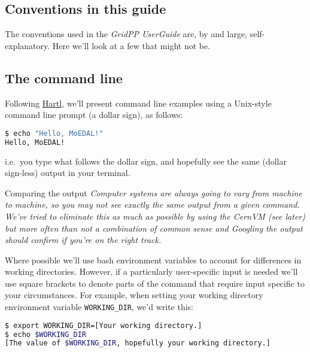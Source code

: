\subsection{Conventions in this guide}
\label{sec:conventions}
The conventions used in the \emph{GridPP UserGuide} are, by and large,
self-explanatory. Here we'll look at a few that might not be.

\subsection{The command line}
\label{sec:the-command-line}

Following \href{https://www.railstutorial.org}{Hartl}, we'll present
command line examples using a Unix-style command line prompt (a dollar
sign), as follows:

\begin{lstlisting}[gobble=0,numbers=none,language=bash]
$ echo "Hello, MoEDAL!"
Hello, MoEDAL!
\end{lstlisting} 

i.e.~you type what follows the dollar sign, and hopefully see the same
(dollar sign-less) output in your terminal.

\begin{warningbox}{Comparing the output}
\emph{Computer systems are always going to vary from machine to machine, so
you may not see exactly the same output from a given command. We've
tried to eliminate this as much as possible by using the CernVM (see
later) but more often than not a combination of common sense and
Googling the output should confirm if you're on the right track.}
\end{warningbox}

Where possible we'll use bash environment variables to account for
differences in working directories. However, if a particularly
user-specific input is needed we'll use square brackets to denote parts
of the command that require input specific to your circumstances. For
example, when setting your working directory environment variable
\texttt{WORKING\_DIR}, we'd write this:


\begin{lstlisting}[gobble=0,numbers=none,language=bash]
$ export WORKING_DIR=[Your working directory.]
$ echo $WORKING_DIR
[The value of $WORKING_DIR, hopefully your working directory.]
\end{lstlisting}

